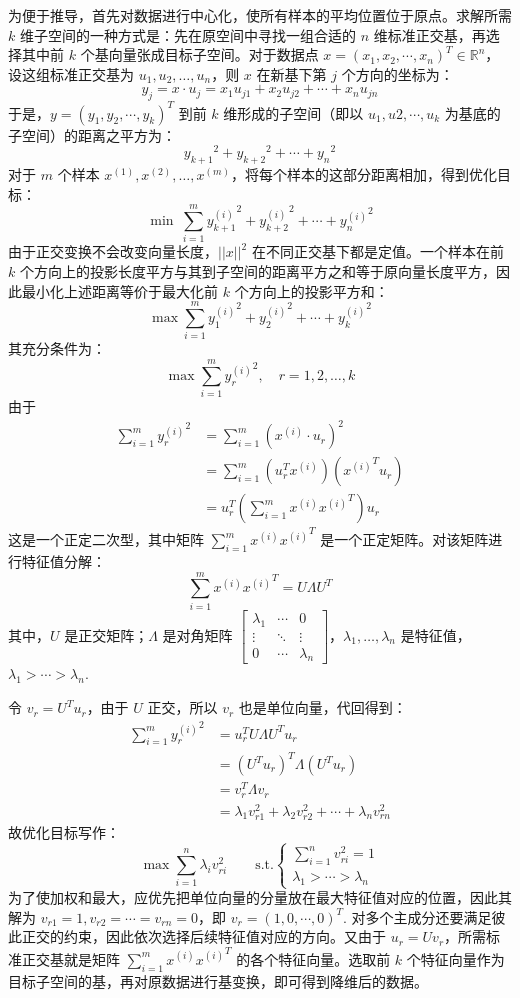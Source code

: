 为便于推导，首先对数据进行中心化，使所有样本的平均位置位于原点。求解所需 $k$ 维子空间的一种方式是：先在原空间中寻找一组合适的 $n$ 维标准正交基，再选择其中前 $k$ 个基向量张成目标子空间。对于数据点 $x=(x_1,x_2,\cdots,x_n)^T\in\mathbb R^n$，设这组标准正交基为 $u_1,u_2,\ldots,u_n$，则 $x$ 在新基下第 $j$ 个方向的坐标为：
\[
y_j=x\cdot u_j=x_1u_{j1}+x_2u_{j2}+\cdots+x_nu_{jn}
\]
于是，$y=(y_1,y_2,\cdots,y_k)^T$ 到前 $k$ 维形成的子空间（即以 $u_1,u2,\cdots,u_k$ 为基底的子空间）的距离之平方为：
\[
{y_{k+1}}^2+{y_{k+2}}^2+\cdots+{y_n}^2
\]
对于 $m$ 个样本 $x^{(1)},x^{(2)},\ldots,x^{(m)}$，将每个样本的这部分距离相加，得到优化目标：
\[
\min~\sum_{i=1}^m {y^{(i)}_{k+1}}^2+{y^{(i)}_{k+2}}^2+\cdots+{y^{(i)}_{n}}^2
\]
由于正交变换不会改变向量长度，${||x||}^2$ 在不同正交基下都是定值。一个样本在前 $k$ 个方向上的投影长度平方与其到子空间的距离平方之和等于原向量长度平方，因此最小化上述距离等价于最大化前 $k$ 个方向上的投影平方和：
\[
\max \sum_{i=1}^m{y^{(i)}_1}^2+{y^{(i)}_2}^2+\cdots+{y^{(i)}_k}^2
\]
其充分条件为：
\[
\max \sum_{i=1}^m {y_r^{(i)}}^2,\quad r=1,2,\ldots,k
\]
由于
\begin{align*}
\sum_{i=1}^m{y^{(i)}_r}^2&=\sum_{i=1}^m(x^{(i)}\cdot u_r)^2\\
&=\sum_{i=1}^m\left(u_r^Tx^{(i)}\right)\left({x^{(i)}}^Tu_r\right)\\
&=u_r^T\left(\sum_{i=1}^mx^{(i)}{x^{(i)}}^T\right) u_r
\end{align*}
这是一个正定二次型，其中矩阵 $\sum_{i=1}^mx^{(i)}{x^{(i)}}^T$ 是一个正定矩阵。对该矩阵进行特征值分解：
\[
\sum_{i=1}^mx^{(i)}{x^{(i)}}^T=U\Lambda U^T
\]
其中，$U$ 是正交矩阵；$\Lambda$ 是对角矩阵 $\begin{bmatrix}\lambda_1&\cdots&0\\\vdots&\ddots&\vdots\\0&\cdots&\lambda_n\end{bmatrix}$，$\lambda_1,\ldots,\lambda_n$ 是特征值，$\lambda_1>\cdots>\lambda_n$.

令 $v_r=U^Tu_r$，由于 $U$ 正交，所以 $v_r$ 也是单位向量，代回得到：
\begin{align*}
\sum_{i=1}^m{y^{(i)}_r}^2&=u_r^TU\Lambda U^Tu_r\\
&=(U^T u_r)^T\Lambda(U^Tu_r)\\
&=v_r^T\Lambda v_r\\
&=\lambda_1v_{r1}^2+\lambda_2v_{r2}^2+\cdots+\lambda_nv_{rn}^2
\end{align*}
故优化目标写作：
\[
\max\sum_{i=1}^n\lambda_iv_{ri}^2
\quad\quad\text{s.t.}\begin{cases}\sum_{i=1}^nv_{ri}^2=1\\\lambda_1>\cdots>\lambda_n\end{cases}
\]
为了使加权和最大，应优先把单位向量的分量放在最大特征值对应的位置，因此其解为 $v_{r1}=1,v_{r2}=\cdots=v_{rn}=0$，即 $v_r=(1,0,\cdots,0)^T$. 对多个主成分还要满足彼此正交的约束，因此依次选择后续特征值对应的方向。又由于 $u_r=Uv_r$，所需标准正交基就是矩阵 $\sum_{i=1}^mx^{(i)}{x^{(i)}}^T$ 的各个特征向量。选取前 $k$ 个特征向量作为目标子空间的基，再对原数据进行基变换，即可得到降维后的数据。


